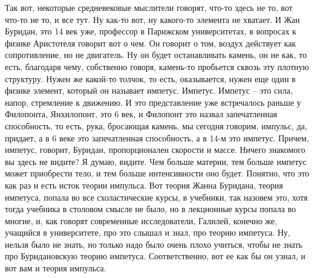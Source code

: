 Так вот, некоторые
средневековые мыслители говорят, что-то здесь не то, вот что-то не то, и все
тут. Ну как-то вот, ну какого-то элемента не хватает. И Жан Буридан, это 14 век
уже, профессор в Парижском университетах, в вопросах к физике Аристотеля говорит
вот о чем. Он говорит о том, воздух действует как сопротивление, но не
двигатель. Ну он будет останавливать камень, он не как, то есть, благодаря чему,
собственно говоря, камень-то пробьется сквозь эту плотную структуру. Нужен же
какой-то толчок, то есть, оказывается, нужен еще один в физике элемент, который
он называет импетус. Импетус. Импетус – это сила, напор, стремление к движению.
И это представление уже встречалось раньше у Филопонта, Янхилопонт, это 6 век, и
Филопонт это назвал запечатленная способность, то есть, рука, бросающая камень,
мы сегодня говорим, импульс, да, придает, а в 6 веке это запечатленная
способность, а в 14-м это импетус. Причем, импетус, говорит, Буридан,
пропорционален скорости и массе. Ничего знакомого вы здесь не видите? Я думаю,
видите. Чем больше материи, тем больше импетус может приобрести тело, и тем
больше интенсивности оно будет. Понятно, что это как раз и есть исток теории
импульса. Вот теория Жанна Буридана, теория импетуса, попала во все
схоластические курсы, в учебники, так назовем это, хотя тогда учебника в
столовом смысле не было, но в лекционные курсы попала во многие, и, как говорят
современные исследователи, Галилей, конечно же, учащийся в университете, про это
слышал и знал, про теорию импетуса. Ну, нельзя было не знать, но только надо
было очень плохо учиться, чтобы не знать про Буридановскую теорию импетуса.
Соответственно, вот ее как бы он узнал, и вот вам и теория импульса. 

